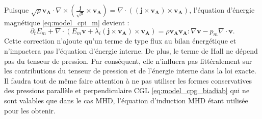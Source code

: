 Puisque $\sqrt{\rho} \boldsymbol{v_A} \cdot \nabla \times \left(\frac{\boldsymbol{j}}{\sqrt{\rho}}  \times \boldsymbol{v_A}\right) = \nabla \cdot \left(\left(\boldsymbol{j}  \times \boldsymbol{v_A}\right)\times \boldsymbol{v_A} \right)$, l'équation d'énergie magnétique \eqref{eq:model_cpi_m} devient :
\begin{equation}
  \label{eq:model_cpgh_m}   \partial_t E_m  +\nabla   \cdot  \left(E_m\boldsymbol{v}+ \lambda_i \left(\boldsymbol{j}  \times \boldsymbol{v_A}\right)\times \boldsymbol{v_A} \right)  = \rho  \boldsymbol{v_A}\boldsymbol{v_A}  : \nabla \boldsymbol{v}- p_m  \nabla \cdot \boldsymbol{v} .
\end{equation}
Cette correction n'ajoute qu'un terme de type flux au bilan énergétique et n'impactera pas l'équation d'énergie interne. De plus, le terme de \acs{Hall} ne dépend pas du tenseur de pression. Par conséquent, elle n'influera pas littéralement sur les contributions du tenseur de pression et de l'énergie interne dans la loi exacte. Il faudra tout de même faire attention à ne pas utiliser les formes conservatives des pressions parallèle et perpendiculaire \acs{CGL} \eqref{eq:model_cpg_biadiab} qui ne sont valables que dans le cas \ac{MHD}, l'équation d'induction \ac{MHD} étant utilisée pour les obtenir.

